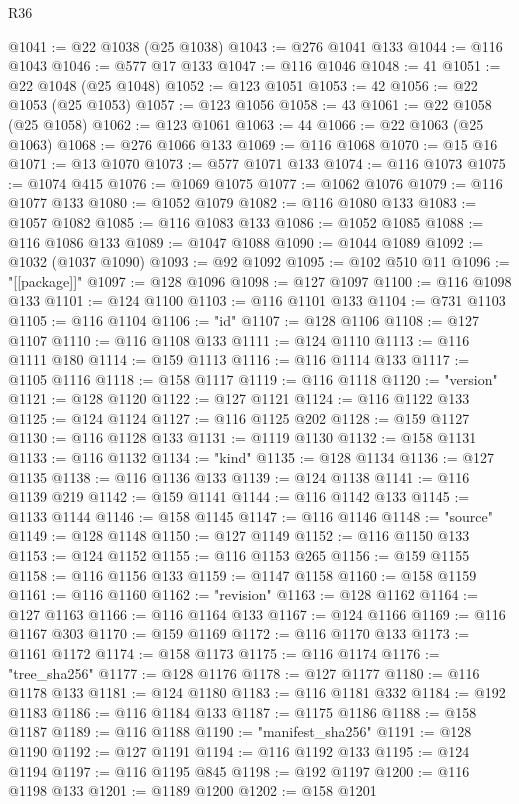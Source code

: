 \begin{lexlean}{R36}
\begin{coremodule}
@1041 := @22 @1038 (@25 @1038)
@1043 := @276 @1041 @133
@1044 := @116 @1043
@1046 := @577 @17 @133
@1047 := @116 @1046
@1048 := 41
@1051 := @22 @1048 (@25 @1048)
@1052 := @123 @1051
@1053 := 42
@1056 := @22 @1053 (@25 @1053)
@1057 := @123 @1056
@1058 := 43
@1061 := @22 @1058 (@25 @1058)
@1062 := @123 @1061
@1063 := 44
@1066 := @22 @1063 (@25 @1063)
@1068 := @276 @1066 @133
@1069 := @116 @1068
@1070 := @15 @16
@1071 := @13 @1070
@1073 := @577 @1071 @133
@1074 := @116 @1073
@1075 := @1074 @415
@1076 := @1069 @1075
@1077 := @1062 @1076
@1079 := @116 @1077 @133
@1080 := @1052 @1079
@1082 := @116 @1080 @133
@1083 := @1057 @1082
@1085 := @116 @1083 @133
@1086 := @1052 @1085
@1088 := @116 @1086 @133
@1089 := @1047 @1088
@1090 := @1044 @1089
@1092 := @1032 (@1037 @1090)
@1093 := @92 @1092
@1095 := @102 @510 @11
@1096 := "[[package]]"
@1097 := @128 @1096
@1098 := @127 @1097
@1100 := @116 @1098 @133
@1101 := @124 @1100
@1103 := @116 @1101 @133
@1104 := @731 @1103
@1105 := @116 @1104
@1106 := "id"
@1107 := @128 @1106
@1108 := @127 @1107
@1110 := @116 @1108 @133
@1111 := @124 @1110
@1113 := @116 @1111 @180
@1114 := @159 @1113
@1116 := @116 @1114 @133
@1117 := @1105 @1116
@1118 := @158 @1117
@1119 := @116 @1118
@1120 := "version"
@1121 := @128 @1120
@1122 := @127 @1121
@1124 := @116 @1122 @133
@1125 := @124 @1124
@1127 := @116 @1125 @202
@1128 := @159 @1127
@1130 := @116 @1128 @133
@1131 := @1119 @1130
@1132 := @158 @1131
@1133 := @116 @1132
@1134 := "kind"
@1135 := @128 @1134
@1136 := @127 @1135
@1138 := @116 @1136 @133
@1139 := @124 @1138
@1141 := @116 @1139 @219
@1142 := @159 @1141
@1144 := @116 @1142 @133
@1145 := @1133 @1144
@1146 := @158 @1145
@1147 := @116 @1146
@1148 := "source"
@1149 := @128 @1148
@1150 := @127 @1149
@1152 := @116 @1150 @133
@1153 := @124 @1152
@1155 := @116 @1153 @265
@1156 := @159 @1155
@1158 := @116 @1156 @133
@1159 := @1147 @1158
@1160 := @158 @1159
@1161 := @116 @1160
@1162 := "revision"
@1163 := @128 @1162
@1164 := @127 @1163
@1166 := @116 @1164 @133
@1167 := @124 @1166
@1169 := @116 @1167 @303
@1170 := @159 @1169
@1172 := @116 @1170 @133
@1173 := @1161 @1172
@1174 := @158 @1173
@1175 := @116 @1174
@1176 := "tree_sha256"
@1177 := @128 @1176
@1178 := @127 @1177
@1180 := @116 @1178 @133
@1181 := @124 @1180
@1183 := @116 @1181 @332
@1184 := @192 @1183
@1186 := @116 @1184 @133
@1187 := @1175 @1186
@1188 := @158 @1187
@1189 := @116 @1188
@1190 := "manifest_sha256"
@1191 := @128 @1190
@1192 := @127 @1191
@1194 := @116 @1192 @133
@1195 := @124 @1194
@1197 := @116 @1195 @845
@1198 := @192 @1197
@1200 := @116 @1198 @133
@1201 := @1189 @1200
@1202 := @158 @1201

\end{coremodule}
\end{lexlean}
